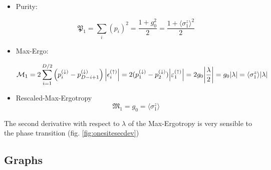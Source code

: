 \documentclass[12pt,a4paper]{book}
\theoremstyle{definition}
\begin{document}
\begin{itemize}
	\item Purity: 
	
	\begin{equation}
		\mathfrak{P}_1=\sum_{i}\left(p_{i}\right)^{2}=\frac{1+g_0^2}{2}=\frac{1+\langle{\sigma}_{1}^{z}\rangle^2}{2}
	\end{equation}
	\item Max-Ergo:
	
	\begin{equation}
		\mathcal{M}_1=2 \sum_{i=1}^{D / 2}\left(p_{i}^{(\downarrow)}-p_{D-i+1}^{(\downarrow)}\right)\left|\epsilon_{i}^{(\uparrow)}\right|=2(p_1^{(\downarrow)}-p_2^{(\downarrow)})\abs{\varepsilon_1^{(\uparrow)}}=2g_0\abs{\frac{\lambda}{2}}=g_0\abs{\lambda}=\langle{\sigma}_{1}^{z}\rangle\abs{\lambda}
	\end{equation}
	\item Rescaled-Max-Ergotropy
	\begin{equation}
		\mathfrak{M}_1=g_0=\langle{\sigma}_{1}^{z}\rangle
	\end{equation}	
	
\end{itemize}
The second derivative with respect to $\lambda$ of the Max-Ergotropy is very sensible to the phase transition (fig. \ref{fig:onesitesecdev})

\clearpage
\subsection{Graphs}
\end{document}
